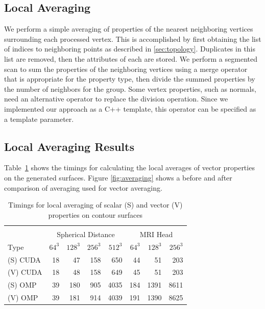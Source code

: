 \documentclass[10pt,journal,cspaper,compsoc]{IEEEtran}
\begin{document}
\subsection{Local Averaging}

We perform a simple averaging of properties of the nearest neighboring vertices surrounding each processed vertex. This is accomplished by first obtaining the list of indices to neighboring points as described in \ref{sec:topology}. Duplicates in this list are removed, then the attributes of each are stored. We perform a segmented scan \cite{Blelloch1991} to sum the properties of the neighboring vertices using a merge operator that is appropriate for the property type, then divide the summed properties by the number of neighbors for the group. Some vertex properties, such as normals, need an alternative operator to replace the division operation. Since we implemented our approach as a C++ template, this operator can be specified as a template parameter.

\subsection{Local Averaging Results}

Table~\ref{tab:timingsaverage} shows the timings for calculating the local averages of vector properties on the generated surfaces. Figure \ref{fig:averaging} shows a before and after comparison of averaging used for vector averaging.

\begin{table}[tb!]
\begin{center}
\caption{Timings for local averaging of scalar (S) and vector (V) properties on contour surfaces}
\label{tab:timingsaverage}
\begin{tabular}{l|r r r r|r r r}
\multicolumn{8}{c}{ } \\
& \multicolumn{4}{|c|}{Spherical Distance} & \multicolumn{3}{|c}{MRI Head}\\
Type & $64^3$ & $128^3$ & $256^3$ & $512^3$ & $64^3$ & $128^3$ & $256^3$\\
\hline
(S) CUDA & 18 & 47 & 158 & 650 & 44 & 51 & 203 \\
(V) CUDA & 18 & 48 & 158 & 649 & 45 & 51 & 203 \\
(S) OMP & 39 & 180 & 905 & 4035 & 184 & 1391 & 8611 \\
(V) OMP & 39 & 181 & 914 & 4039 & 191 & 1390 & 8625 \\
\end{tabular}
\end{center}
\end{table}
\end{document}
